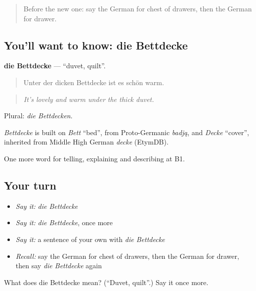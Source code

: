 \begin{quote}
Before the new one: say the German for chest of drawers, then the German for drawer.
\end{quote}

\subsection*{You'll want to know: die Bettdecke}
\textbf{die Bettdecke} — \textquotedblleft{}duvet, quilt\textquotedblright{}.

\begin{quote}
Unter der dicken Bettdecke ist es schön warm.
\end{quote}

\begin{quote}
\emph{It's lovely and warm under the thick duvet.}
\end{quote}

Plural: \emph{die Bettdecken}.

\begin{cousinweb}
\emph{Bettdecke} is built on \emph{Bett} \textquotedblleft{}bed\textquotedblright{}, from Proto-Germanic \emph{badją}, and \emph{Decke} \textquotedblleft{}cover\textquotedblright{}, inherited from Middle High German \emph{decke} (EtymDB).
\end{cousinweb}

\begin{grammarlens}[title={What you've built}]
One more word for telling, explaining and describing at B1.
\end{grammarlens}

\subsection*{Your turn}
\begin{itemize}
\raggedright
  \item \emph{Say it:} \emph{die Bettdecke}
  \item \emph{Say it:} \emph{die Bettdecke}, once more
  \item \emph{Say it:} a sentence of your own with \emph{die Bettdecke}
  \item \emph{Recall:} say the German for chest of drawers, then the German for drawer, then say \emph{die Bettdecke} again
\end{itemize}

\begin{tcolorbox}[breakable,colback=teal!4,colframe=teal!35!black,title={Before you move on}]
What does die Bettdecke mean? (\textquotedblleft{}Duvet, quilt\textquotedblright{}.) Say it once more.
\end{tcolorbox}
